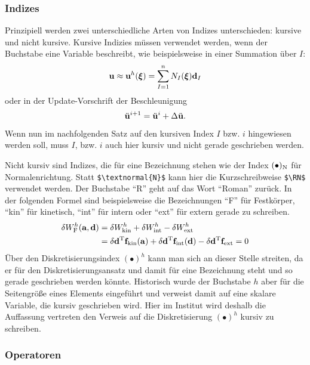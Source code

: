 \subsubsection{Indizes}

Prinzipiell werden zwei unterschiedliche Arten von Indizes unterschieden:
kursive und nicht kursive. Kursive Indizies müssen verwendet werden, wenn
der Buchstabe eine Variable beschreibt, wie beispielsweise in einer Summation
über $I$:
\begin{align}
{\mathbf u} \approx {\mathbf u}^h ({\boldsymbol \xi}) = \sum_{I=1}^n N_I({\boldsymbol \xi}) {\mathbf d}_I
\label{eq:verschiebungsansatz}
\end{align}
oder in der Update-Vorschrift der Beschleunigung
\begin{align}
\ddot{{\mathbf u}}^{i+1} = \ddot{{\mathbf u}}^{i}+{\Delta} \ddot{{\mathbf u}} .
\label{eq:update_iteration}
\end{align}
Wenn nun im nachfolgenden Satz auf
den kursiven Index $I$ bzw. $i$ hingewiesen werden
soll, muss $I$, bzw. $i$ auch hier kursiv und nicht gerade geschrieben
werden.

Nicht kursiv sind Indizes, die für eine Bezeichnung stehen wie der Index
$(\bullet)_{\mathrm{N}}$ für Normalenrichtung. Statt \verb+$\textnormal{N}$+ kann hier
die Kurzschreibweise \verb+$\RN$+ verwendet werden. Der Buchstabe "`R"' geht auf
das Wort "`Roman"' zurück.
In der folgenden Formel sind beispielsweise die Bezeichnungen "`F"' für Festkörper, "`kin"' für kinetisch, "`int"' für
intern oder "`ext"' für extern gerade zu schreiben.
\begin{align}
\begin{split}
{\delta} W_{\mathrm{F}}^h ({\mathbf a}, {\mathbf d}) &= {\delta} W_{\textnormal{kin}}^h+ {\delta} W_{{\mathrm{int}}}^h-
{\delta} W_{{\mathrm{ext}}}^h  \\
&= {\delta} {\mathbf d}^{\mathrm{T}} {\mathbf f}_\textnormal{kin}({\mathbf a})
+ {\delta} {\mathbf d}^{\mathrm{T}} {\mathbf f}_{\mathrm{int}}({\mathbf d})
- {\delta} {\mathbf d}^{\mathrm{T}} {\mathbf f}_{\mathrm{ext}} = 0
\end{split}
\label{eq:semi_dis_virt_arbeit}
\end{align}
%
Über den Diskretisierungsindex $(\bullet)^h$ kann man sich an dieser Stelle
streiten, da er für den Diskretisierungsansatz und damit für eine Bezeichnung
steht und so gerade geschrieben werden könnte. Historisch wurde der Buchstabe
$h$ aber für die Seitengröße eines Elements eingeführt und verweist damit auf eine skalare Variable, die kursiv
geschrieben wird. Hier im Institut wird deshalb die Auffassung vertreten den
Verweis auf die Diskretisierung $(\bullet)^h$ kursiv zu schreiben.



\subsubsection{Operatoren}

